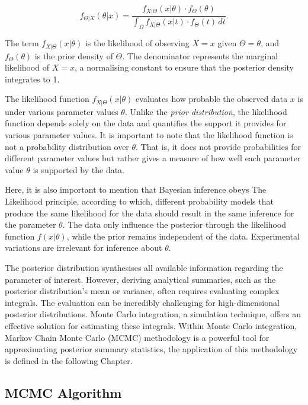 \documentclass[
  11pt,
]{article}
\begin{document}
\begin{equation}
f_{\Theta|X}(\theta|x) = \frac{f_{X|\Theta}(x|\theta) \cdot f_{\Theta}(\theta)} {\int_{\Omega} f_{X|\Theta}(x|t) \cdot f_{\Theta}(t) \, dt}.
\end{equation}

The term \(f_{X|\Theta}(x|\theta)\) is the likelihood of observing
\(X = x\) given \(\Theta = \theta\), and \(f_{\Theta}(\theta)\) is the
prior density of \(\Theta\). The denominator represents the marginal
likelihood of \(X = x\), a normalising constant to ensure that the
posterior density integrates to 1.

The likelihood function \(f_{X|\Theta}(x|\theta)\) evaluates how
probable the observed data \(x\) is under various parameter values
\(\theta\). Unlike the \emph{prior distribution}, the likelihood
function depends solely on the data and quantifies the support it
provides for various parameter values. It is important to note that the
likelihood function is not a probability distribution over \(\theta\).
That is, it does not provide probabilities for different parameter
values but rather gives a measure of how well each parameter value
\(\theta\) is supported by the data.

Here, it is also important to mention that Bayesian inference obeys The
Likelihood principle, according to which, different probability models
that produce the same likelihood for the data should result in the same
inference for the parameter \(\theta\). The data only influence the
posterior through the likelihood function \(f(x|\theta)\), while the
prior remains independent of the data. Experimental variations are
irrelevant for inference about \(\theta\).

The posterior distribution synthesises all available information
regarding the parameter of interest. However, deriving analytical
summaries, such as the posterior distribution's mean or variance, often
requires evaluating complex integrals. The evaluation can be incredibly
challenging for high-dimensional posterior distributions. Monte Carlo
integration, a simulation technique, offers an effective solution for
estimating these integrals. Within Monte Carlo integration, Markov Chain
Monte Carlo (MCMC) methodology is a powerful tool for approximating
posterior summary statistics, the application of this methodology is
defined in the following Chapter.

\subsection{MCMC Algorithm}
\end{document}
